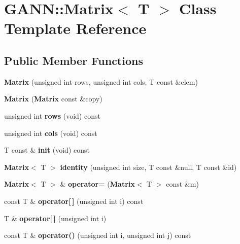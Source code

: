 \section{G\+A\+N\+N\+:\+:Matrix$<$ T $>$ Class Template Reference}
\label{class_g_a_n_n_1_1_matrix}
\subsection*{Public Member Functions}
\begin{DoxyCompactItemize}
\item 
{\bfseries Matrix} (unsigned int rows, unsigned int cols, T const \&elem)\label{class_g_a_n_n_1_1_matrix_a370ad3ace72e48cf5ac3d2fd672dd679}

\item 
{\bfseries Matrix} ({\bf Matrix} const \&copy)\label{class_g_a_n_n_1_1_matrix_a9af1de05104cf864d0089575e772b74b}

\item 
unsigned int {\bfseries rows} (void) const \label{class_g_a_n_n_1_1_matrix_a14c1233ee25f1cd5823676277e1956f2}

\item 
unsigned int {\bfseries cols} (void) const \label{class_g_a_n_n_1_1_matrix_adc449f757249fe5bfc5bdae3c809d7e7}

\item 
T const \& {\bfseries init} (void) const \label{class_g_a_n_n_1_1_matrix_a5369d9c2dc7ae6a0941f1aba36f15259}

\item 
{\bf Matrix}$<$ T $>$ {\bfseries identity} (unsigned int size, T const \&null, T const \&id)\label{class_g_a_n_n_1_1_matrix_ae61ef07a101463ad49ab8f9f7dd4f2fe}

\item 
{\bf Matrix}$<$ T $>$ \& {\bfseries operator=} ({\bf Matrix}$<$ T $>$ const \&m)\label{class_g_a_n_n_1_1_matrix_a0aa93d1a66567637deb98c943f936fd4}

\item 
const T \& {\bfseries operator[$\,$]} (unsigned int i) const \label{class_g_a_n_n_1_1_matrix_add9f200cb6a2e53709090621e3a1150a}

\item 
T \& {\bfseries operator[$\,$]} (unsigned int i)\label{class_g_a_n_n_1_1_matrix_a700ad2c1e9ab4fd76fe1cb18092a80f1}

\item 
const T \& {\bfseries operator()} (unsigned int i, unsigned int j) const \label{class_g_a_n_n_1_1_matrix_aa3bef5292a718f45e094926602ff65ca}


\end{DoxyCompactItemize}
